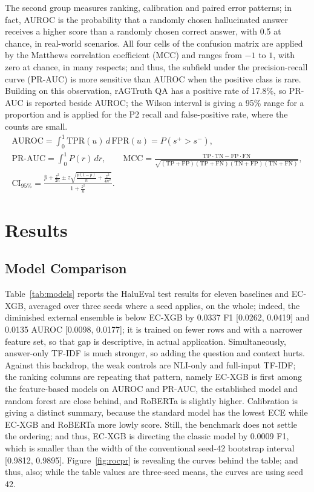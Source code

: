 \documentclass[a4paper,fleqn]{cas-sc}
\begin{document}
The second group measures ranking, calibration and paired error patterns; in fact, AUROC is the probability that a randomly chosen hallucinated answer receives a higher score than a randomly chosen correct answer, with 0.5 at chance, in real-world scenarios. All four cells of the confusion matrix are applied by the Matthews correlation coefficient (MCC) and ranges from $-1$ to $1$, with zero at chance, in many respects; and thus, the subfield under the precision-recall curve (PR-AUC) is more sensitive than AUROC when the positive class is rare. Building on this observation, rAGTruth QA has a positive rate of 17.8\%, so PR-AUC is reported beside AUROC; the Wilson interval is giving a 95\% range for a proportion and is applied for the P2 recall and false-positive rate, where the counts are small.
\begin{gather}
  \mathrm{AUROC} = \int_{0}^{1} \mathrm{TPR}(u)\, d\,\mathrm{FPR}(u) = P(s^{+} > s^{-}), \\
  \mathrm{PR\text{-}AUC} = \int_{0}^{1} P(r)\, dr, \qquad
  \mathrm{MCC} = \frac{\mathrm{TP}\cdot\mathrm{TN} - \mathrm{FP}\cdot\mathrm{FN}}{\sqrt{(\mathrm{TP}+\mathrm{FP})(\mathrm{TP}+\mathrm{FN})(\mathrm{TN}+\mathrm{FP})(\mathrm{TN}+\mathrm{FN})}}, \\
  \mathrm{CI}_{95\%} = \frac{\hat{p} + \frac{z^2}{2n} \pm z\sqrt{\frac{\hat{p}(1-\hat{p})}{n} + \frac{z^2}{4n^2}}}{1 + \frac{z^2}{n}}.
\end{gather}

\section{Results}\label{sec:results}

\subsection{Model Comparison}

Table~\ref{tab:models} reports the HaluEval test results for eleven baselines and EC-XGB, averaged over three seeds where a seed applies, on the whole; indeed, the diminished external ensemble is below EC-XGB by 0.0337 F1 [0.0262, 0.0419] and 0.0135 AUROC [0.0098, 0.0177]; it is trained on fewer rows and with a narrower feature set, so that gap is descriptive, in actual application. Simultaneously, answer-only TF-IDF is much stronger, so adding the question and context hurts. Against this backdrop, the weak controls are NLI-only and full-input TF-IDF; the ranking columns are repeating that pattern, namely EC-XGB is first among the feature-based models on AUROC and PR-AUC, the established model and random forest are close behind, and RoBERTa is slightly higher. Calibration is giving a distinct summary, because the standard model has the lowest ECE while EC-XGB and RoBERTa more lowly score. Still, the benchmark does not settle the ordering; and thus, EC-XGB is directing the classic model by 0.0009 F1, which is smaller than the width of the conventional seed-42 bootstrap interval [0.9812, 0.9895]. Figure~\ref{fig:rocpr} is revealing the curves behind the table; and thus, also; while the table values are three-seed means, the curves are using seed 42.
\end{document}
